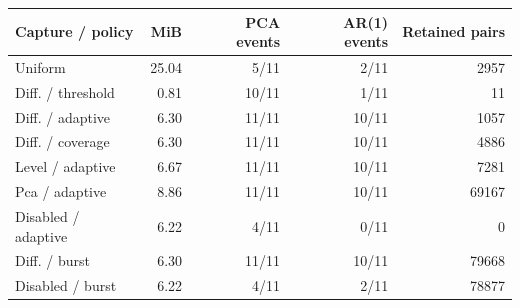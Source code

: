 \begin{tabular}{lrrrr}
\toprule
Capture / policy & MiB & PCA events & AR(1) events & Retained pairs \\
\midrule
Uniform & 25.04 & 5/11 & 2/11 & 2957 \\
Diff. / threshold & 0.81 & 10/11 & 1/11 & 11 \\
Diff. / adaptive & 6.30 & 11/11 & 10/11 & 1057 \\
Diff. / coverage & 6.30 & 11/11 & 10/11 & 4886 \\
Level / adaptive & 6.67 & 11/11 & 10/11 & 7281 \\
Pca / adaptive & 8.86 & 11/11 & 10/11 & 69167 \\
Disabled / adaptive & 6.22 & 4/11 & 0/11 & 0 \\
Diff. / burst & 6.30 & 11/11 & 10/11 & 79668 \\
Disabled / burst & 6.22 & 4/11 & 2/11 & 78877 \\
\bottomrule
\end{tabular}

